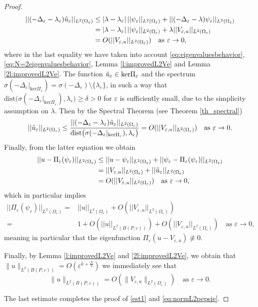 \documentclass[11pt,reqno]{article}
\numberwithin{equation}{section}
\newcommand\e\varepsilon
\begin{document}
\begin{proof}
		\begin{align*}
			|| (-\Delta_\e - \lambda_\e)\Tilde{u}_\e ||_{L^2(\Omega_\e)} 
			&\leq|\lambda - \lambda_\e|\, || \psi_\e||_{L^2(\Omega_\e)}
			+ || (-\Delta_\e - \lambda)\psi_\e ||_{L^2(\Omega_\e)}\\
			&=|\lambda - \lambda_\e|\, || \psi_\e||_{L^2(\Omega_\e)}
			+ \lambda || V_{\e,u} ||_{L^2(\Omega_\e)}\\
			&=O(|| V_{\e,u} ||_{L^2(\Omega_\e)}) \quad \text{as }\e\to0,
		\end{align*}
		where in the last equality we have taken into account \eqref{eq:eigenvaluesbehavior}, \eqref{eq:N=2eigenvaluesbehavior}, Lemma \ref{l:improvedL2Ve} and Lemma \ref{2l:improvedL2Ve}.  
		The function $\Tilde{u}_\e \in \mathrm{ker}\Pi_\e$ and the spectrum $\sigma({-\Delta_\e}|_{ \mathrm{ker}\Pi_\e})=\sigma(-\Delta_\e) \setminus \{\lambda_\e\}$, in such a way that $\mathrm{dist}\big(\sigma({-\Delta_\e}|_{ \mathrm{ker}\Pi_\e}), \lambda_\e\big)\geq\delta>0$ for $\e$ is sufficiently small, due to the simplicity assumption on $\lambda$.
		Then by the Spectral Theorem (see Theorem \ref{th_spectral})
		\begin{equation}\label{eq:normtildeue}
			|| \Tilde{u}_\e ||_{L^2(\Omega_\e)} \leq \dfrac{|| (-\Delta_\e - \lambda_\e)\Tilde{u}_\e ||_{L^2(\Omega_\e)}}{\mathrm{dist}\big(\sigma({-\Delta_\e}|_{ \mathrm{ker}\Pi_\e}), \lambda_\e\big)}
			=O(|| V_{\e,u} ||_{L^2(\Omega_\e)}) \quad \text{as }\e\to0.
		\end{equation}
		Finally, from the latter equation we obtain
		\begin{align*}
			|| u-\Pi_\e(\psi_\e) ||_{L^2(\Omega_\e)} &\leq || u-\psi_\e||_{L^2(\Omega_\e)} + ||\psi_\e- \Pi_\e(\psi_\e) ||_{L^2(\Omega_\e)} \\
			&= ||V_{\e,u}||_{L^2(\Omega_\e)} + ||\Tilde{u}_\e||_{L^2(\Omega_\e)} \\
			&=O(|| V_{\e,u} ||_{L^2(\Omega_\e)}) \quad \text{as }\e\to0,
		\end{align*}
		which in particular implies 
        	\begin{equation*}
            \begin{aligned}
                ||\Pi_\e(\psi_\e)||_{L^2(\Omega_\e)} = &||u||_{L^2(\Omega_\e)} + O(|| V_{\e,u} ||_{L^2(\Omega_\e)})\\
                =&1+O(||u||_{L^2( B(P,\e))}) + O(|| V_{\e,u} ||_{L^2(\Omega_\e)})\quad \text{as }\e\to0,
            \end{aligned}
		\end{equation*}
meaning in particular that the eigenfunction $\Pi_\e (u-V_{\e,u})\not\equiv0$. 

Finally, by Lemma \ref{l:improvedL2Ve} and \ref{2l:improvedL2Ve},  we obtain  that $\|u\|_{L^2(B(P,\e))} = O(\e^{k+\frac{N}{2}})$ we immediately see that 
\begin{equation}\label{eq:negligible}
\|u\|_{L^2(B(P,\e))} = O(\|V_{\e,u}\|_{L^2(\Omega_\e)}) \quad \text{as }\e\to0.
\end{equation}

The last estimate completes the proof of \eqref{est1} and \eqref{eq:normL2pepsie}. 
\end{proof}
\end{document}
